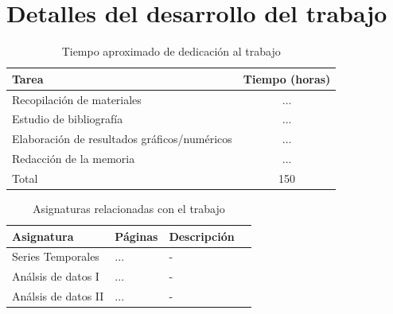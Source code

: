 \documentclass[12pt,twoside]{article}
\begin{document}
\newpage
\appendix

\section{Detalles del desarrollo del trabajo}


\begin{table}[ht] 
\centering
\begin{tabular}{lc} 
  \hline
 Tarea & Tiempo (horas) \\ 
  \hline
Recopilación de materiales &   ... \\ 
Estudio de bibliografía &   ... \\ 
Elaboración de resultados gráficos/numéricos &  ... \\ 
Redacción de la memoria &  ... \\
 \hline
Total & 150\\
\hline
\end{tabular}
\caption{Tiempo aproximado de dedicación al trabajo} \label{tab{02}}
\end{table}

\begin{table}[ht] 
\centering
\begin{tabular}{llll} 
  \hline
 Asignatura & Páginas & Descripción  \\ 
  \hline
Series Temporales   & ... & - \\ 
Análsis de datos I  & ... & - \\ 
Análsis de datos II & ... & - \\ 
\hline
\end{tabular}
\caption{Asignaturas relacionadas con el trabajo} \label{tab{03}}
\end{table}
\end{document}
